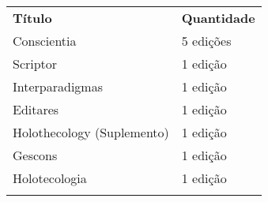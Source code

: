 \documentclass[
]{article}
\begin{document}
\begin{longtable}[]{@{}
  >{\raggedright\arraybackslash}p{}
  >{\raggedright\arraybackslash}p{}@{}}
\toprule\noalign{}
\begin{minipage}[b]{\linewidth}\centering
\textbf{Título}
\end{minipage} & \begin{minipage}[b]{\linewidth}\centering
\textbf{Quantidade}
\end{minipage} \\
\begin{minipage}[b]{\linewidth}\raggedright
Conscientia
\end{minipage} & \begin{minipage}[b]{\linewidth}\raggedright
5 edições
\end{minipage} \\
\begin{minipage}[b]{\linewidth}\raggedright
Scriptor
\end{minipage} & \begin{minipage}[b]{\linewidth}\raggedright
1 edição
\end{minipage} \\
\begin{minipage}[b]{\linewidth}\raggedright
Interparadigmas
\end{minipage} & \begin{minipage}[b]{\linewidth}\raggedright
1 edição
\end{minipage} \\
\begin{minipage}[b]{\linewidth}\raggedright
Editares
\end{minipage} & \begin{minipage}[b]{\linewidth}\raggedright
1 edição
\end{minipage} \\
\begin{minipage}[b]{\linewidth}\raggedright
Holothecology (Suplemento)
\end{minipage} & \begin{minipage}[b]{\linewidth}\raggedright
1 edição
\end{minipage} \\
\begin{minipage}[b]{\linewidth}\raggedright
Gescons
\end{minipage} & \begin{minipage}[b]{\linewidth}\raggedright
1 edição
\end{minipage} \\
\begin{minipage}[b]{\linewidth}\raggedright
Holotecologia
\end{minipage} & \begin{minipage}[b]{\linewidth}\raggedright
1 edição
\end{minipage} \\
\midrule\noalign{}
\endhead
\bottomrule\noalign{}
\endlastfoot
\end{longtable}
\end{document}

